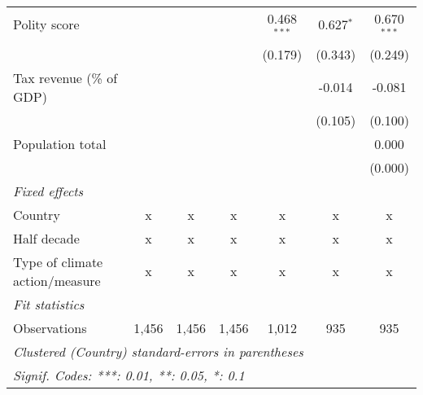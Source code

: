\begin{tabular}{lcccccc}
   Polity score                                                         &                &                &               & 0.468$^{***}$ & 0.627$^{*}$  & 0.670$^{***}$\\   
                                                                        &                &                &               & (0.179)       & (0.343)      & (0.249)\\   
   Tax revenue (\% of GDP)                                              &                &                &               &               & -0.014       & -0.081\\   
                                                                        &                &                &               &               & (0.105)      & (0.100)\\   
   Population total                                                     &                &                &               &               &              & 0.000\\   
                                                                        &                &                &               &               &              & (0.000)\\   
   \emph{Fixed effects}\\
   Country                                                              & x              & x              & x             & x             & x            & x\\  
   Half decade                                                          & x              & x              & x             & x             & x            & x\\  
   Type of climate action/measure                                       & x              & x              & x             & x             & x            & x\\  
   \midrule \emph{Fit statistics}\\
   Observations                                                         & 1,456          & 1,456          & 1,456         & 1,012         & 935          & 935\\  
   \midrule
   \multicolumn{7}{l}{\emph{Clustered (Country) standard-errors in parentheses}}\\
   \multicolumn{7}{l}{\emph{Signif. Codes: ***: 0.01, **: 0.05, *: 0.1}}\\
\end{tabular}
\par\endgroup


